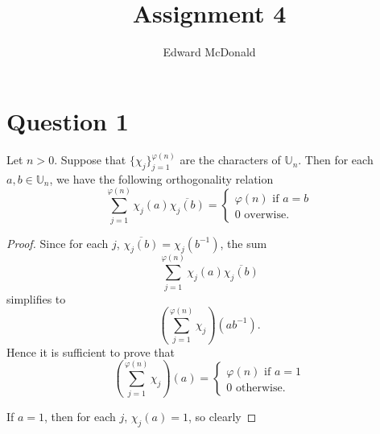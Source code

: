 \documentclass{unswmaths}
\begin{document}
\subject{Number Theory}
\author{Edward McDonald}
\title{Assignment 4}


\setlength\parindent{0pt}

\newcommand{\Unit}{\mathbb{U}}

\unswtitle{}

\section*{Question 1}
    \begin{lemma}
        Let $n > 0$. Suppose that $\{\chi_j\}_{j=1}^{\varphi(n)}$ are the characters
        of $\Unit_n$. Then for each $a,b\in \Unit_n$, we have the following orthogonality
        relation
        \begin{equation*}
            \sum_{j=1}^{\varphi(n)} \chi_j(a)\overline{\chi_j(b)} = \begin{cases}
                \varphi(n)\text{ if }a = b\\
                0\text{ overwise.}
            \end{cases}
        \end{equation*}
    \end{lemma}
    \begin{proof}
        Since for each $j$, $\overline{\chi_j(b)} = \chi_j(b^{-1})$, the sum
        \begin{equation*}
            \sum_{j=1}^{\varphi(n)} \chi_j(a)\overline{\chi_j(b)}
        \end{equation*}
        simplifies to
        \begin{equation*}
            \left(\sum_{j=1}^{\varphi(n)}\chi_j\right)(ab^{-1}).
        \end{equation*}
        Hence it is sufficient to prove that
        \begin{equation*}
            \left( \sum_{j=1}^{\varphi(n)} \chi_j\right)(a) = \begin{cases}
                \varphi(n)\text{ if }a = 1\\
                0\text{ otherwise.}
            \end{cases}
        \end{equation*}
        
        If $a = 1$, then for each $j$, $\chi_j(a) = 1$, so clearly
    \end{proof}
    
\end{document}
